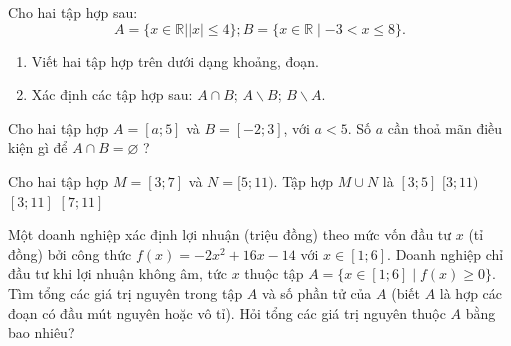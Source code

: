 \begin{bt}%
	Cho hai tập hợp sau:
	$$
	A=\{x \in \mathbb{R}|| x \mid \leq 4\} ; B=\{x \in \mathbb{R} \mid-3<x \leq 8\} .
	$$
	\begin{enumerate}
		\item 	Viết hai tập hợp trên dưới dạng khoảng, đoạn.
		\item 	Xác định các tập hợp sau: $A \cap B$; $A \backslash B$; $B \backslash A$.
	\end{enumerate}
	\loigiai{
		\begin{itemize}
			\item 	$A=[-4;4]$; $B=\left( -3;8\right] $.
			\item 	$A \cap B=(-3;4]$; $A \backslash B=[-4;-3]$; $B \backslash A=(4;8]$.
		\end{itemize}
}	
\end{bt}

\begin{bt}%
	Cho hai tập hợp $A=[a ; 5]$ và $B=[-2 ; 3]$, với $a<5$. Số $a$ cần thoả mãn điều kiện gì để $A \cap B=\varnothing$ ?
\end{bt}

\begin{ex}%
	Cho hai tập hợp $M=[3;7]$ và $N=[5;11)$. Tập hợp $M\cup N$ là
	\choice
		{$[3;5]$}
		{\True $[3;11)$}
		{$[3;11]$}
		{$[7;11]$}
	\loigiai{
		Ta có $M\cup N=[3;7]\cup [5;11)=[3;11)$.
	}
\end{ex}

\begin{bt}%
	Một doanh nghiệp xác định lợi nhuận (triệu đồng) theo mức vốn đầu tư $x$ (tỉ đồng) bởi công thức $f(x)=-2x^2+16x-14$ với $x\in[1;6]$. Doanh nghiệp chỉ đầu tư khi lợi nhuận không âm, tức $x$ thuộc tập $A=\{x\in[1;6]\mid f(x)\ge 0\}$. Tìm tổng các giá trị nguyên trong tập $A$ và số phần tử của $A$ (biết $A$ là hợp các đoạn có đầu mút nguyên hoặc vô tỉ). Hỏi tổng các giá trị nguyên thuộc $A$ bằng bao nhiêu?
	
\end{bt}

